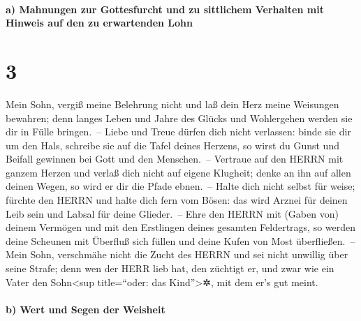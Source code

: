 \hypertarget{a-mahnungen-zur-gottesfurcht-und-zu-sittlichem-verhalten-mit-hinweis-auf-den-zu-erwartenden-lohn}{%
\paragraph{a) Mahnungen zur Gottesfurcht und zu sittlichem Verhalten mit
Hinweis auf den zu erwartenden
Lohn}\label{a-mahnungen-zur-gottesfurcht-und-zu-sittlichem-verhalten-mit-hinweis-auf-den-zu-erwartenden-lohn}}

\hypertarget{section-2}{%
\section{3}\label{section-2}}

Mein Sohn, vergiß meine Belehrung nicht und laß dein Herz
meine Weisungen bewahren; denn langes Leben und Jahre des
Glücks und Wohlergehen werden sie dir in Fülle bringen.~--
Liebe und Treue dürfen dich nicht verlassen: binde sie dir
um den Hals, schreibe sie auf die Tafel deines Herzens, so
wirst du Gunst und Beifall gewinnen bei Gott und den Menschen.~--
Vertraue auf den HERRN mit ganzem Herzen und verlaß dich
nicht auf eigene Klugheit; denke an ihn auf allen deinen
Wegen, so wird er dir die Pfade ebnen.~-- Halte dich nicht
selbst für weise; fürchte den HERRN und halte dich fern vom Bösen:
das wird Arznei für deinen Leib sein und Labsal für deine
Glieder.~-- Ehre den HERRN mit (Gaben von) deinem Vermögen
und mit den Erstlingen deines gesamten Feldertrags, so
werden deine Scheunen mit Überfluß sich füllen und deine Kufen von Most
überfließen.~-- Mein Sohn, verschmähe nicht die Zucht des
HERRN und sei nicht unwillig über seine Strafe; denn wen
der HERR lieb hat, den züchtigt er, und zwar wie ein Vater den
Sohn\textless sup title=``oder: das Kind''\textgreater✲, mit dem er's
gut meint.

\hypertarget{b-wert-und-segen-der-weisheit}{%
\paragraph{b) Wert und Segen der
Weisheit}\label{b-wert-und-segen-der-weisheit}}

